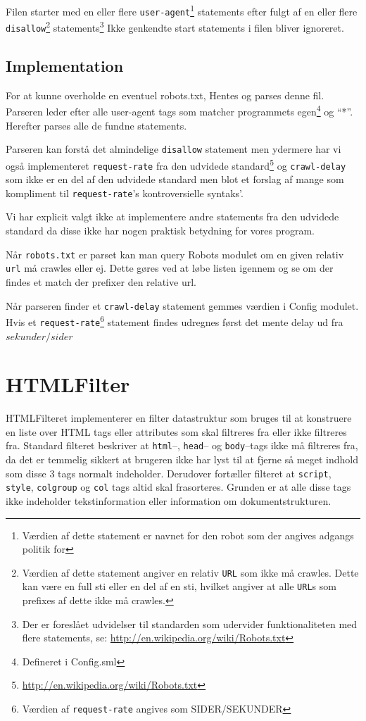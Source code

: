 \documentclass[a4paper,oneside,article]{memoir}
\begin{document}
Filen starter med en eller flere \texttt{user-agent}\footnote{Værdien af dette
statement er navnet for den robot som der angives adgangs politik for}
statements efter fulgt af en eller flere \texttt{disallow}\footnote{Værdien af
dette statement angiver en relativ \texttt{URL} som ikke må crawles. Dette kan
være en full sti eller en del af en sti, hvilket angiver at alle \texttt{URL}s
som prefixes af dette ikke må crawles.} statements\footnote{Der er foreslået
udvidelser til standarden som udervider funktionaliteten med flere statements,
se: \url{http://en.wikipedia.org/wiki/Robots.txt}} 
Ikke genkendte start statements i filen bliver ignoreret.

\subsection{Implementation}

For at kunne overholde en eventuel robots.txt, Hentes og parses denne fil.
Parseren leder efter alle user-agent tags som matcher
programmets egen\footnote{Defineret i Config.sml} og ``*''. Herefter
parses alle de fundne statements.

Parseren kan forstå det almindelige \texttt{disallow} statement men
ydermere har vi også implementeret \texttt{request-rate} fra den udvidede
standard\footnote{\url{http://en.wikipedia.org/wiki/Robots.txt}} og
\texttt{crawl-delay} som ikke er en del af den udvidede standard men blot et
forslag af mange som kompliment til \texttt{request-rate}'s kontroversielle
syntaks'.

Vi har explicit valgt ikke at implementere andre statements fra den
udvidede standard da disse ikke har nogen praktisk betydning for vores
program.

Når \texttt{robots.txt} er parset kan man query Robots modulet om en given
relativ \texttt{url} må crawles eller ej. Dette gøres ved at løbe listen igennem
og se om der findes et match der prefixer den relative url.

Når parseren finder et \texttt{crawl-delay} statement gemmes værdien i Config
modulet. Hvis et \texttt{request-rate}\footnote{Værdien af \texttt{request-rate}
angives som SIDER/SEKUNDER} statement
findes udregnes først det mente delay ud fra $sekunder / sider$

\section{HTMLFilter}
\label{HTMLFilter}

HTMLFilteret implementerer en filter datastruktur som bruges til at
konstruere en liste over HTML tags eller attributes som skal filtreres
fra eller ikke filtreres fra.  Standard filteret beskriver at
\texttt{html}--, \texttt{head}-- og \texttt{body}--tags ikke må filtreres
fra, da det er temmelig sikkert at brugeren ikke har lyst til at
fjerne så meget indhold som disse 3 tags normalt indeholder. Derudover
fortæller filteret at \texttt{script}, \texttt{style},
\texttt{colgroup} og \texttt{col} tags altid skal frasorteres. Grunden
er at alle disse tags ikke indeholder tekstinformation eller
information om dokumentstrukturen.
\end{document}
